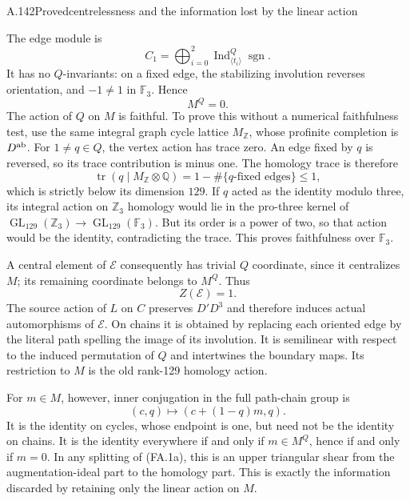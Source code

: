 \begin{statement}{A.142}{Proved}{centrelessness and the information lost by the linear action}
\end{statement}
The edge module is
\[
 C_1=\bigoplus_{i=0}^2
       \operatorname{Ind}_{\langle t_i\rangle}^{Q}
                      \operatorname{sgn}.
\]
It has no $Q$-invariants: on a fixed edge, the
stabilizing involution reverses orientation, and
$-1\ne1$ in $\mathbb F_3$. Hence
\[
                              M^Q=0.
 \tag{FA.2a}
\]
The action of $Q$ on $M$ is faithful. To prove this
without a numerical faithfulness test, use the same
integral graph cycle lattice $M_{\mathbb Z}$, whose
profinite completion is $D^{\rm ab}$. For $1\ne q\in Q$, the
vertex action has trace zero. An edge fixed by $q$
is reversed, so its trace contribution is minus one.
The homology trace is therefore
\[
          \operatorname{tr}(q\mid M_{\mathbb Z}\otimes\mathbb Q)
                       =1-\#\{q\text{-fixed edges}\}\leq1,
\]
which is strictly below its dimension $129$.
If $q$ acted as the identity modulo three, its
integral action on $\mathbb Z_3$ homology would lie
in the pro-three kernel of
$\operatorname{GL}_{129}(\mathbb Z_3)\to
\operatorname{GL}_{129}(\mathbb F_3)$. But its order
is a power of two, so that action would be the
identity, contradicting the trace. This proves
faithfulness over $\mathbb F_3$.

A central element of $\mathcal E$ consequently
has trivial $Q$ coordinate, since it centralizes
$M$; its remaining coordinate belongs to $M^Q$.
Thus
\[
                         Z(\mathcal E)=1.
 \tag{FA.2b}
\]
The source action of $L$ on $C$ preserves $D'D^3$
and therefore induces actual automorphisms of
$\mathcal E$. On chains it is obtained by replacing
each oriented edge by the literal path spelling
the image of its involution. It is semilinear
with respect to the induced permutation of $Q$
and intertwines the boundary maps. Its restriction
to $M$ is the old rank-129 homology action.

For $m\in M$, however, inner conjugation in the
full path-chain group is
\[
       (c,q)\longmapsto(c+(1-q)m,q).
 \tag{FA.2c}
\]
It is the identity on cycles, whose endpoint is
one, but need not be the identity on chains.
It is the identity everywhere if and only if
$m\in M^Q$, hence if and only if $m=0$.
In any splitting of (FA.1a), this is an upper
triangular shear from the augmentation-ideal
part to the homology part. This is exactly
the information discarded by retaining only
the linear action on $M$.

